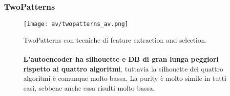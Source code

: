 \subsubsection{TwoPatterns}
\begin{figure}[H]
	\centering
	\texttt{[image: av/twopatterns\_av.png]}
	\caption{TwoPatterns con tecniche di feature extraction and selection.\\
	\\
	\textbf{L'autoencoder ha silhouette e DB di gran lunga peggiori rispetto ai quattro algoritmi}, tuttavia la silhouette dei quattro algoritmi è comunque molto bassa. La purity è molto simile in tutti casi, sebbene anche essa risulti molto bassa.}
	\label{fig:twopatterns_av}
\end{figure}